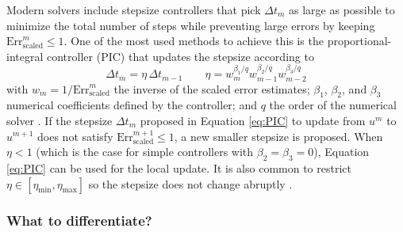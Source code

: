 Modern solvers include stepsize controllers that pick $\Delta t_m$ as large as possible to minimize the total number of steps while preventing large errors by keeping $\text{Err}^m_\text{scaled} \leq 1$. 
One of the most used methods to achieve this is the proportional-integral controller (PIC) that updates the stepsize according to 
\begin{equation}
    \Delta t_{m} = \eta \, \Delta t_{m-1}
    \qquad 
    \eta = w_{m}^{\beta_1 / q} w_{m-1}^{\beta_2 / q} w_{m-2}^{\beta_3 / q}
    \label{eq:PIC}
\end{equation}
with $w_{m} = 1 / \text{Err}_\text{scaled}^{m}$ the inverse of the scaled error estimates; $\beta_1$, $\beta_2$, and $\beta_3$ numerical coefficients defined by the controller; and $q$ the order of the numerical solver \cite{hairer-solving-2, Ranocha_Dalcin_Parsani_Ketcheson_2022}. 
If the stepsize $\Delta t_{m}$ proposed in Equation \eqref{eq:PIC} to update from $u^{m}$ to $u^{m+1}$ does not satisfy $\text{Err}_\text{scaled}^{m+1} \leq 1$, a new smaller stepsize is proposed. 
When $\eta < 1$ (which is the case for simple controllers with $\beta_2 = \beta_3 = 0$), Equation \eqref{eq:PIC} can be used for the local update. 
It is also common to restrict $\eta \in [\eta_\text{min}, \eta_\text{max}]$ so the stepsize does not change abruptly \cite{hairer-solving-1}. 



\subsubsection{What to differentiate?}

